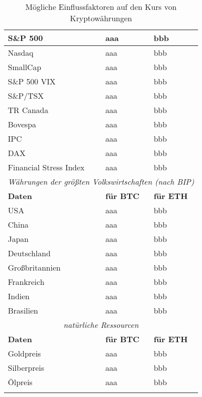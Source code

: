 \begin{longtable}[H]{|p{}|p{5cm}|p{5cm}|}
S\&P 500	& aaa & bbb \\ \hline 
Nasdaq	 & aaa & bbb \\ \hline
SmallCap & aaa & bbb \\ \hline
S\&P 500 VIX& aaa & bbb \\ \hline	
S\&P/TSX	& aaa & bbb \\ \hline 
TR Canada  & aaa & bbb \\ \hline
Bovespa	& aaa & bbb \\ \hline	 
IPC & aaa & bbb \\ \hline
DAX	& aaa & bbb \\ \hline
Financial Stress Index & aaa & bbb \\ \hline
\multicolumn{3}{c}{\textit{Währungen der größten Volkswirtschaften (nach BIP)}}\\ \hline
\textbf{Daten} & \textbf{für BTC} & \textbf{für ETH} \\
\hhline{===}
USA & aaa & bbb \\ \hline
China& aaa & bbb \\ \hline
Japan& aaa & bbb \\ \hline
Deutschland & aaa & bbb \\ \hline
Großbritannien & aaa & bbb \\ \hline
Frankreich & aaa & bbb \\ \hline
Indien & aaa & bbb \\ \hline
Brasilien & aaa & bbb \\ \hline
\multicolumn{3}{c}{\textit{natürliche Ressourcen}}\\ \hline
\textbf{Daten} & \textbf{für BTC} & \textbf{für ETH} \\
\hhline{===}
Goldpreis & aaa & bbb \\ \hline
Silberpreis & aaa & bbb \\ \hline
Ölpreis & aaa & bbb \\ \hline
\caption{Mögliche Einflussfaktoren auf den Kurs von Kryptowährungen}
\label{tab:dataToAnalyse}
\end{longtable}






